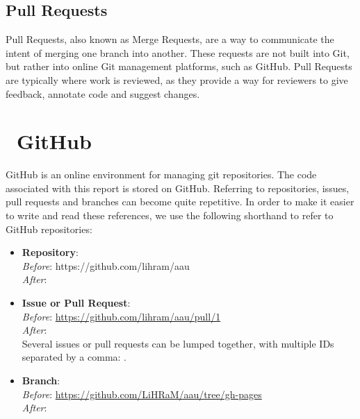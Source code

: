 \subsection*{Pull Requests}
Pull Requests, also known as Merge Requests, are a way to communicate the intent of merging one branch into another.
These requests are not built into Git, but rather into online Git management platforms, such as GitHub.
Pull Requests are typically where work is reviewed, as they provide a way for reviewers to give feedback, annotate code and suggest changes.

\section*{\faGithub~GitHub}
GitHub is an online environment for managing git repositories.
The code associated with this report is stored on GitHub.
Referring to repositories, issues, pull requests and branches can become quite repetitive.
In order to make it easier to write and read these references, we use the following shorthand to refer to GitHub repositories:
\begin{itemize}
      \item{
            \textbf{Repository}: \\
            \textit{Before}: https://github.com/lihram/aau\\
            \textit{After}: 
            }
      \item{
            \textbf{Issue or Pull Request}: \\
            \textit{Before}: \url{https://github.com/lihram/aau/pull/1}\\
            \textit{After}: \\
            Several issues or pull requests can be lumped together, with multiple IDs separated by a comma: .
            }
      \item{
            \textbf{Branch}: \\
            \textit{Before}: \url{https://github.com/LiHRaM/aau/tree/gh-pages}\\
            \textit{After}: 
            }
\end{itemize}
